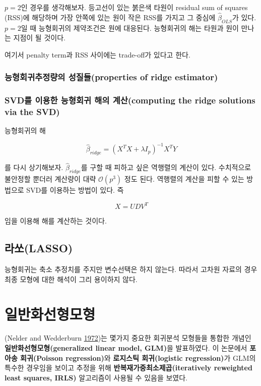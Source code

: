 \documentclass[b5paper,]{book}
\theoremstyle{definition}
\theoremstyle{definition}
\theoremstyle{definition}
\theoremstyle{remark}
\begin{document}
\(p=2\)인 경우를 생각해보자. 등고선이 있는 붉은색 타원이 residual sum of
squares (RSS)에 해당하며 가장 안쪽에 있는 원이 작은 RSS를 가지고 그
중심에 \(\hat{\beta}_{OLS}\)가 있다. \(p=2\)일 때 능형회귀의 제약조건은
원에 대응된다. 능형회귀의 해는 타원과 원이 만나는 지점이 될 것이다.

여기서 penalty term과 RSS 사이에는 trade-off가 있다고 한다.

\subsection{능형회귀추정량의 성질들(properties of ridge
estimator)}\label{-properties-of-ridge-estimator}

\subsection{SVD를 이용한 능형회귀 해의 계산(computing the ridge
solutions via the
SVD)}\label{svd----computing-the-ridge-solutions-via-the-svd}

능형회귀의 해

\[\hat{\beta}_{ridge}=(X^{T}X+\lambda I_{p})^{-1}X^{T}Y\]

를 다시 상기해보자. \(\hat{\beta}_{ridge}\)를 구할 때 피하고 싶은
역행렬의 계산이 있다. 수치적으로 불안정할 뿐더러 계산량이 대략
\(\mathcal{O}(p^{3})\) 정도 된다. 역행렬의 계산을 피할 수 있는 방법으로
SVD를 이용하는 방법이 있다. 즉

\[X=UDV^{T}\]

임을 이용해 해를 계산하는 것이다.

\section{라쏘(LASSO)}\label{lasso}

능형회귀는 축소 추정치를 주지만 변수선택은 하지 않는다. 따라서 고차원
자료의 경우 최종 모형에 대한 해석이 그리 용이하지 않다.

\chapter{일반화선형모형}\label{glm}

(Nelder and Wedderburn \protect\hyperlink{ref-Nelder1972}{1972})는
몇가지 중요한 회귀분석 모형들을 통합한 개념인
\textbf{일반화선형모형(generalized linear model, GLM)}을 발표하였다. 이
논문에서 \textbf{포아송 회귀(Poisson regression)}와 \textbf{로지스틱
회귀(logistic regression)}가 GLM의 특수한 경우임을 보이고 추정을 위해
\textbf{반복재가중최소제곱(iteratively reweighted least squares, IRLS)}
알고리즘이 사용될 수 있음을 보였다.
\end{document}
